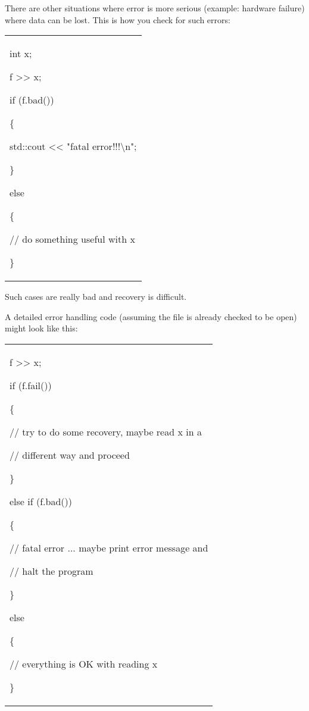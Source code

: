 \documentclass[
]{article}
\begin{document}
There are other situations where error is more serious (example:
hardware failure) where data can be lost. This is how you check for such
errors:

\begin{longtable}[]{@{}
  >{\raggedright\arraybackslash}p{}@{}}
\toprule\noalign{}
 \\
\midrule\noalign{}
\endhead
\bottomrule\noalign{}
\endlastfoot
int x;

f \textgreater\textgreater{} x;

if (f.bad())

\{

std::cout \textless\textless{} "fatal error!!!\textbackslash n";

\}

else

\{

// do something useful with x

\} \\
\end{longtable}

Such cases are really bad and recovery is difficult.

A detailed error handling code (assuming the file is already checked to
be open) might look like this:

\begin{longtable}[]{@{}
  >{\raggedright\arraybackslash}p{}@{}}
\toprule\noalign{}
 \\
\midrule\noalign{}
\endhead
\bottomrule\noalign{}
\endlastfoot
f \textgreater\textgreater{} x;

if (f.fail())

\{

// try to do some recovery, maybe read x in a

// different way and proceed

\}

else if (f.bad())

\{

// fatal error ... maybe print error message and

// halt the program

\}

else

\{

// everything is OK with reading x

\} \\
\end{longtable}
\end{document}
